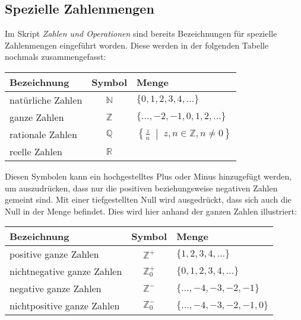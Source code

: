 \subsection{Spezielle Zahlenmengen}

Im Skript \textit{Zahlen und Operationen} sind bereits Bezeichnungen für spezielle Zahlenmengen eingeführt worden. Diese werden in der folgenden Tabelle nochmals zusammengefasst:

\begin{center}
  \renewcommand{\arraystretch}{1.3}
  \begin{tabularx}{0.8\textwidth}{Xcl}
      \textbf{Bezeichnung} & \textbf{Symbol} & \textbf{Menge} \\
    \toprule
      natürliche Zahlen    & $\mathbb{N}$    & $\{0, 1, 2, 3, 4, \ldots\}$ \\
    \midrule
      ganze Zahlen         & $\mathbb{Z}$    & $\{\ldots, -2, -1, 0, 1, 2, \ldots\}$ \\
    \midrule
      rationale Zahlen     & $\mathbb{Q}$    & $\left\{\tfrac{z}{n} \;\middle|\; z,n\in\mathbb{Z}, n\neq 0 \right\} $ \\
    \midrule
      reelle Zahlen        & $\mathbb{R}$    & \\
    \bottomrule
  \end{tabularx}
\end{center}

Diesen Symbolen kann ein hochgestelltes Plus oder Minus hinzugefügt werden, um auszudrücken, dass nur die positiven beziehungsweise negativen Zahlen gemeint sind. Mit einer tiefgestellten Null wird ausgedrückt, dass sich auch die Null in der Menge befindet. Dies wird hier anhand der ganzen Zahlen illustriert:
\begin{center}
  \renewcommand{\arraystretch}{1.3}
  \begin{tabularx}{0.8\textwidth}{Xcl}
      \textbf{Bezeichnung}       & \textbf{Symbol}      & \textbf{Menge} \\
    \toprule
      positive ganze Zahlen      & $\mathbb{Z}^{+}$     & $\{1, 2, 3, 4, \ldots\}$ \\
    \midrule
      nichtnegative ganze Zahlen & $\mathbb{Z}_{0}^{+}$ & $\{0, 1, 2, 3, 4, \ldots\}$ \\
    \midrule
      negative ganze Zahlen      & $\mathbb{Z}^{-}$     & $\{\ldots, -4, -3, -2, -1 \}$ \\
    \midrule
      nichtpositive ganze Zahlen & $\mathbb{Z}_{0}^{-}$ & $\{\ldots, -4, -3, -2, -1, 0 \}$ \\
    \bottomrule
  \end{tabularx}
\end{center}

